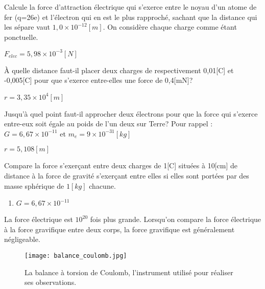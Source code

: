\begin{exercise}
    Calcule la force d'attraction électrique qui s'exerce entre le noyau d'un atome de fer (q=26e) et l'électron qui en est le plus rapproché, sachant que la distance qui les sépare vaut \(1,0 \times 10^{-12}[m]\). On considère chaque charge comme étant ponctuelle.
\end{exercise}
\begin{solution}
    \(F_{elec}=5,98 \times 10^{-3}[N]\)
\end{solution}

\begin{exercise}
    À quelle distance faut-il placer deux charges de respectivement 0,01[C] et -0,005[C] pour que s'exerce entre-elles une force de 0,4[mN]?
\end{exercise}
\begin{solution}
    \(r=3,35 \times 10^4 [m]\)
\end{solution}

\begin{exercise}
    Jusqu'à quel point faut-il approcher deux électrons pour que la force qui s'exerce entre-eux soit égale au poids de l'un deux sur Terre?
    Pour rappel : \(G=6,67 \times 10^{-11}\) et \(m_e=9 \times 10^{-31} [kg]\)
\end{exercise}
\begin{solution}
    \(r=5,108[m]\)
\end{solution}


\begin{exercise}
    Compare la force s'exerçant entre deux charges de 1[C] situées à 10[cm] de distance à la force de gravité s'exerçant entre elles si elles sont portées par des masse sphérique de \(1 [kg]\) chacune.
    \begin{enumerate}[label=\textbullet]
        \item \(G=6,67 \times 10^{-11}\)
    \end{enumerate}
\end{exercise}
\begin{solution}
    La force électrique est \(10^20\) fois plus grande. Lorsqu'on compare la force électrique à la force gravifique entre deux corps, la force gravifique est généralement négligeable.
\end{solution}

\begin{figure}[h!]
    \centering
    \texttt{[image: balance\_coulomb.jpg]}
    \caption{La balance à torsion de Coulomb, l'instrument utilisé pour réaliser ses observations.}
    \label{balance_coulomb}
\end{figure}
